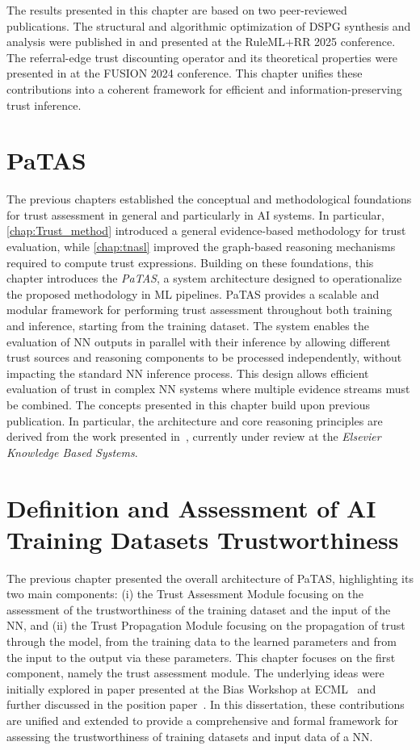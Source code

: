 The results presented in this chapter are based on two peer-reviewed publications. The structural and algorithmic optimization of \ac{DSPG} synthesis and analysis were published in \cite{10.1007/978-3-032-08887-1_4} and presented at the RuleML+RR 2025 conference. The referral-edge trust discounting operator and its theoretical properties were presented in \cite{10706345} at the FUSION 2024 conference. This chapter unifies these contributions into a coherent framework for efficient and information-preserving trust inference.

\chapter{\acf{PaTAS}}
The previous chapters established the conceptual and methodological foundations for trust assessment in general and particularly in \ac{AI} systems. In particular, \cref{chap:Trust_method} introduced a general evidence-based methodology for trust evaluation, while \cref{chap:tnasl} improved the graph-based reasoning mechanisms required to compute trust expressions. Building on these foundations, this chapter introduces the \emph{\acf{PaTAS}}, a system architecture designed to operationalize the proposed methodology in \ac{ML} pipelines. \ac{PaTAS} provides a scalable and modular framework for performing trust assessment throughout both training and inference, starting from the training dataset. The system enables the evaluation of \ac{NN} outputs in parallel with their inference by allowing different trust sources and reasoning components to be processed independently, without impacting the standard \ac{NN} inference process. This design allows efficient evaluation of trust in complex \ac{NN} systems where multiple evidence streams must be combined. The concepts presented in this chapter build upon previous publication. In particular, the architecture and core reasoning principles are derived from the work presented in~\cite{patas}, currently under review at the \emph{Elsevier Knowledge Based Systems}.

\chapter{Definition and Assessment of AI Training Datasets Trustworthiness}
\label{chap:data}
The previous chapter presented the overall architecture of \ac{PaTAS}, highlighting its two main components: (i) the Trust Assessment Module focusing on the assessment of the
trustworthiness of the training dataset and the input of the \ac{NN}, and (ii) the Trust Propagation Module focusing on the propagation of trust through the model, from the training data to the learned parameters and from the input to the output via these parameters. This chapter focuses on the first component, namely the trust assessment module. The underlying ideas were initially explored in paper presented at the Bias Workshop at ECML~\cite{10.1007/978-3-032-19096-3_17} and further discussed in the position paper~\cite{trust-aidatatrust}. In this dissertation, these contributions are unified and extended to provide a comprehensive and formal framework for assessing the trustworthiness of training datasets and input data of a \ac{NN}.


